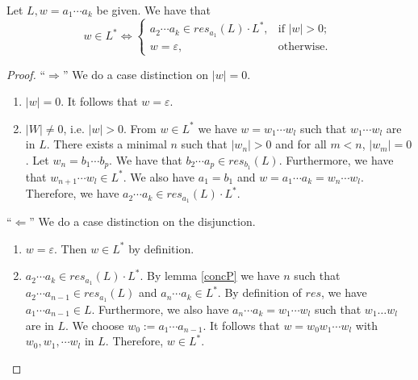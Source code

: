    \begin{lemma}
        \label{starP}
        Let $L, w = a_1 \cdots a_k$ be given. We have that
        \begin{equation*}
            w \in L^*   
            \iff
                \left\{
                    \begin{array}{ll}
                         a_2 \cdots a_k \in res_{a_1}(L) \cdot L^*, & \mbox{if } |w| > 0; \\
                         w = \varepsilon, & \mbox{otherwise. }
                    \end{array}
                \right.
        \end{equation*}
    \end{lemma}
    \begin{proof}
        ``$\Rightarrow$'' 
        We do a case distinction on $|w| = 0$.
        \begin{enumerate}
            \item
                $|w| = 0$. It follows that $w = \varepsilon$.
            \item
                $|W| \neq 0$, i.e. $|w| > 0$.
                From $w \in L^*$ we have $w = w_1 \cdots w_l$ such that $w_1 \cdots w_l$ are in $L$.
                There exists a minimal $n$ such that $|w_n| > 0$ and for all $m < n$, $|w_m| = 0$.
                Let $w_n = b_1 \cdots b_p$. We have that $b_2 \cdots a_p \in res_{b_1}(L)$.
                Furthermore, we have that $w_{n+1} \cdots w_l \in L^*$.
                We also have $a_1 = b_1$ and $w = a_1 \cdots a_k = w_n \cdots w_l$. 
                Therefore, we have $a_2 \cdots a_k \in res_{a_1}(L) \cdot L^*$.
        \end{enumerate}
        ``$\Leftarrow$'' 
        We do a case distinction on the disjunction.
        \begin{enumerate}
            \item
                $w = \varepsilon$. Then $w \in L^*$ by definition.
            \item
                $a_2 \cdots a_k \in res_{a_1}(L) \cdot L^*$. 
                By lemma \ref{concP} we have $n$ such that $a_2 \cdots a_{n-1} \in res_{a_1}(L)$ and $a_n \cdots a_k \in L^*$.
                By definition of $res$, we have $a_1 \cdots a_{n-1} \in L$.
                Furthermore, we also have $a_n \cdots a_k = w_1 \cdots w_l$ such that $w_1 \ldots w_l$ are in $L$.
                We choose $w_0 := a_1 \cdots a_{n-1}$.
                It follows that $w = w_0 w_1 \cdots w_l$ with $w_0, w_1, \cdots w_l$ in $L$.
                Therefore, $w \in L^*$.
        \end{enumerate}
    \end{proof}


